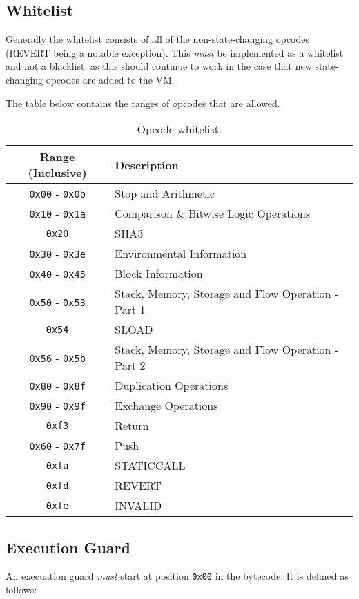 \documentclass[english,a4paper]{article}
\begin{document}
\subsection{Whitelist}\label{opcode-whitelist}
Generally the whitelist consists of all of the non-state-changing opcodes (REVERT being a notable exception). This
\emph{must} be implemented as a whitelist and not a blacklist, as this should
continue to work in the case that new state-changing opcodes are added to the
VM.

The table below contains the ranges of opcodes that are allowed.

\begin{table}[H]
  \caption{Opcode whitelist.}
  \centering{}%
  \begin{tabularx}{\textwidth}{c | X }
    \hline
    Range (Inclusive) & Description \\
    \hline
    \hline
    \texttt{0x00} - \texttt{0x0b} & Stop and Arithmetic \\
    \texttt{0x10} - \texttt{0x1a} & Comparison \& Bitwise Logic Operations \\
    \texttt{0x20} & SHA3 \\
    \texttt{0x30} - \texttt{0x3e} & Environmental Information \\
    \texttt{0x40} - \texttt{0x45} & Block Information \\
    \texttt{0x50} - \texttt{0x53} & Stack, Memory, Storage and Flow Operation - Part 1\\
    \texttt{0x54} & SLOAD \\
    \texttt{0x56} - \texttt{0x5b} & Stack, Memory, Storage and Flow Operation - Part 2 \\
    \texttt{0x80} - \texttt{0x8f} & Duplication Operations \\
    \texttt{0x90} - \texttt{0x9f} & Exchange Operations \\
    \texttt{0xf3} & Return \\
    \texttt{0x60} - \texttt{0x7f} & Push \\
    \texttt{0xfa} & STATICCALL \\
    \texttt{0xfd} & REVERT \\
    \texttt{0xfe} & INVALID \\
    \hline
  \end{tabularx}
\end{table}

\subsection{Execution Guard}\label{execution-guard}
An execuation guard \emph{must} start at position \texttt{0x00} in the bytecode.
It is defined as follows:
\end{document}
